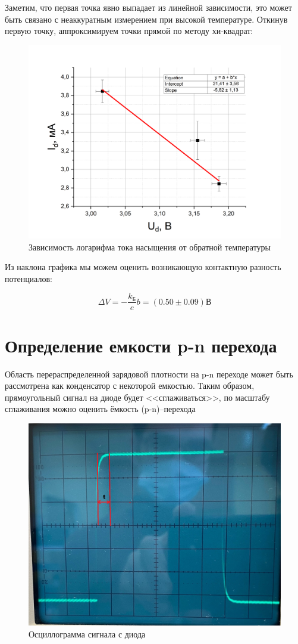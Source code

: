 \documentclass[a4paper,12pt]{article}
\begin{document}
Заметим, что первая точка явно выпадает из линейной зависимости, это может быть связано с неаккуратным измерением при высокой температуре. Откинув первую точку, аппроксимируем точки прямой по методу хи-квадрат:

\newpage

\begin{figure}[h!]
	\centering
	\includegraphics[width=0.7\linewidth]{reverse_current_approx}
	\caption{Зависимость логарифма тока насыщения от обратной температуры}
\end{figure}

Из наклона графика мы можем оценить возникающую контактную разность потенциалов:

$$
	\Delta V = -\frac{k_Б}{e} b = (0.50 \pm 0.09) В
$$

\section*{Определение емкости p-n перехода}

Область перераспределенной зарядовой плотности на p-n переходе может быть рассмотрена как конденсатор с некоторой емкостью. Таким образом, прямоугольный сигнал на диоде будет <<сглаживаться>>, по масштабу сглаживания можно оценить ёмкость (p-n)--перехода

\begin{figure}[h!]
	\centering
	\includegraphics[width=0.6\linewidth]{capacity}
	\caption{Осциллограмма сигнала с диода}
\end{figure}
\end{document}
